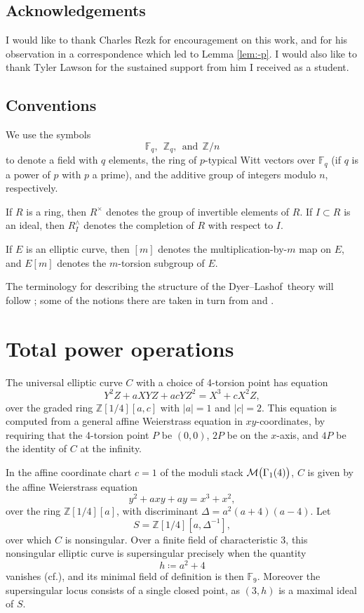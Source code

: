 \documentclass{gtpart}
\theoremstyle{definition}
\theoremstyle{remark}
\newcommand{\mb}[1]{\mathbb{#1}}
\newcommand{\cff}[2]{cf.\thinspace{\cite[#1]{#2}}}
\newcommand{\DL}{Dyer--Lashof~}
\newcommand{\BF}{{\mb F}}
\newcommand{\BZ}{{\mb Z}}
\newcommand{\CM}{{\cal M}}
\newcommand{\G}{\Gamma}
\begin{document}
\subsection*{Acknowledgements}

I would like to thank Charles Rezk for encouragement on this work, and for his observation in a correspondence which led to Lemma \ref{lem:-p}.  
I would also like to thank Tyler Lawson for the sustained support from him I received as a student.  


\subsection*{Conventions}

We use the symbols 
\[
 \BF_q,~~\BZ_q,~~\text{and}~~\BZ/n 
\]
to denote a field with $q$ elements, the ring of $p$-typical Witt vectors over $\BF_q$ (if $q$ is a power of $p$ with $p$ a prime), 
and the additive group of integers modulo $n$, respectively.  

If $R$ is a ring, then $R^\times$ denotes the group of invertible elements of $R$.  
If $I \subset R$ is an ideal, then $R_I^\wedge$ denotes the completion of $R$ with respect to $I$.  

If $E$ is an elliptic curve, then $[m]$ denotes the multiplication-by-$m$ map on $E$, and $E[m]$ denotes the $m$-torsion subgroup of $E$.  

The terminology for describing the structure of the \DL theory will follow \cite{cong, h2p2}; 
some of the notions there are taken in turn from \cite{BW} and \cite{V}.  


\section{Total power operations}
\label{sec:psi}

The universal elliptic curve $C$ with a choice of 4-torsion point has equation 
\[
 Y^2 Z + a X Y Z + a c Y Z^2 = X^3 + c X^2 Z, 
\]
over the graded ring $\BZ [1/4] [a,c]$ with $|a| = 1$ and $|c| = 2$.  
This equation is computed from a general affine Weierstrass equation in $xy$-coordinates, 
by requiring that the 4-torsion point $P$ be $(0,0)$, $2P$ be on the $x$-axis, and $4P$ be the identity of $C$ at the infinity.  

In the affine coordinate chart $c = 1$ of the moduli stack $\CM \big(\G_1(4)\big)$, 
$C$ is given by the affine Weierstrass equation 
\[
 y^2 + a x y + a y = x^3 + x^2, 
\]
over the ring $\BZ [1/4] [a]$, with discriminant $\Delta = a^2 (a + 4) (a - 4)$.  
Let 
\[
 S = \BZ [1/4] [a, \Delta^{-1}], 
\]
over which $C$ is nonsingular.  
Over a finite field of characteristic 3, this nonsingular elliptic curve is supersingular precisely when the quantity 
\[
 h \coloneqq a^2 + 4 
\]
vanishes (\cff{V.4.1a}{AEC}), and its minimal field of definition is then $\BF_9$.  
Moreover the supersingular locus consists of a single closed point, as $(3,h)$ is a maximal ideal of $S$.  
\end{document}
